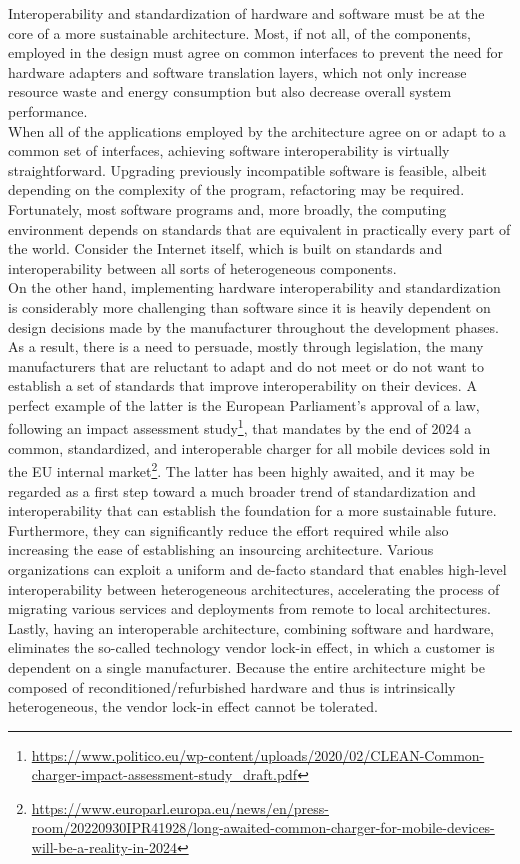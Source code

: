 Interoperability and standardization of hardware and software must be at the core
of a more sustainable architecture. Most, if not all, of the components, employed
in the design must agree on common interfaces to prevent the need for hardware adapters
and software translation layers, which not only increase resource waste and
energy consumption but also decrease overall system performance. \\ %
When all of the applications employed by the architecture agree on or adapt to a
common set of interfaces, achieving software interoperability is virtually straightforward.
Upgrading previously incompatible software is feasible, albeit depending on the complexity
of the program, refactoring may be required. Fortunately, most software programs
and, more broadly, the computing environment depends on standards that are
equivalent in practically every part of the world. Consider the Internet itself,
which is built on standards and interoperability between all sorts of
heterogeneous components. \\ %
On the other hand, implementing hardware interoperability and standardization is
considerably more challenging than software since it is heavily dependent on design
decisions made by the manufacturer throughout the development phases. As a
result, there is a need to persuade, mostly through legislation, the many manufacturers
that are reluctant to adapt and do not meet or do not want to establish a set of
standards that improve interoperability on their devices. A perfect example of
the latter is the European Parliament's approval of a law, following an impact assessment
study\footnote{\url{https://www.politico.eu/wp-content/uploads/2020/02/CLEAN-Common-charger-impact-assessment-study_draft.pdf}},
that mandates by the end of 2024 a common, standardized, and interoperable
charger for all mobile devices sold in the EU internal market\footnote{\url{https://www.europarl.europa.eu/news/en/press-room/20220930IPR41928/long-awaited-common-charger-for-mobile-devices-will-be-a-reality-in-2024}}.
The latter has been highly awaited, and it may be regarded as a first step
toward a much broader trend of standardization and interoperability that can
establish the foundation for a more sustainable future. \\ %
Furthermore, they can significantly reduce the effort required while also increasing
the ease of establishing an insourcing architecture. Various organizations can
exploit a uniform and de-facto standard that enables high-level interoperability
between heterogeneous architectures, accelerating the process of migrating various
services and deployments from remote to local architectures. \\ %
Lastly, having an interoperable architecture, combining software and hardware,
eliminates the so-called technology vendor lock-in effect, in which a customer is
dependent on a single manufacturer. Because the entire architecture might be
composed of reconditioned/refurbished hardware and thus is intrinsically
heterogeneous, the vendor lock-in effect cannot be tolerated. \\ %

